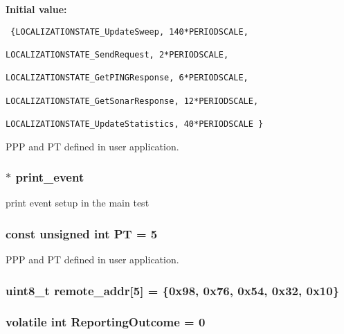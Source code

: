 {\bf Initial value:}

\footnotesize\begin{verbatim} {LOCALIZATIONSTATE_UpdateSweep, 140*PERIODSCALE, 
                                                                LOCALIZATIONSTATE_SendRequest, 2*PERIODSCALE, 
                                                                LOCALIZATIONSTATE_GetPINGResponse, 6*PERIODSCALE, 
                                                                LOCALIZATIONSTATE_GetSonarResponse, 12*PERIODSCALE,
                                                                LOCALIZATIONSTATE_UpdateStatistics, 40*PERIODSCALE }
\end{verbatim}\normalsize 
PPP and PT defined in user application. 
\subsubsection{$\ast$ {\bf print\_\-event}}\label{_assignment2_8c_51abdaff62ed7e507e74802d6aaad2f0}


print event setup in the main test 
\subsubsection{\setlength{\rightskip}{0pt plus 5cm}const unsigned int {\bf PT} = 5}\label{_assignment2_8c_6370d00b2f49ebb4a69edf643003ada2}


PPP and PT defined in user application. 
\subsubsection{\setlength{\rightskip}{0pt plus 5cm}uint8\_\-t {\bf remote\_\-addr}[5] = \{0x98, 0x76, 0x54, 0x32, 0x10\}}\label{_assignment2_8c_9d7fc80f8ba5c0334cc9738d54356069}


\subsubsection{\setlength{\rightskip}{0pt plus 5cm}volatile int {\bf Reporting\-Outcome} = 0}\label{_assignment2_8c_8c5cd9581fcbd7ce69feab7f3199d124}



